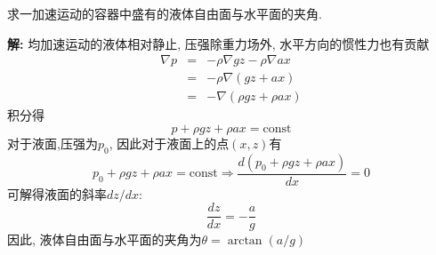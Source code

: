 \begin{problem}[问题4.1]
求一加速运动的容器中盛有的液体自由面与水平面的夹角.
\begin{center}

\end{center}
\end{problem}

\begin{solution}
\textbf{解:} 均加速运动的液体相对静止, 压强除重力场外, 水平方向的惯性力也有贡献
\begin{eqnarray}
\nabla p & = & -\rho\nabla gz-\rho\nabla ax\nonumber\\
         & = & -\rho\nabla(gz+ax)\nonumber\\
         & = & -\nabla(\rho gz+\rho ax)\nonumber
\end{eqnarray}
积分得
\[
p + \rho gz+\rho ax = \mathrm{const}
\]
对于液面,压强为$p_0$, 因此对于液面上的点$(x,z)$有
\[
p_0 + \rho gz+\rho ax = \mathrm{const}\Rightarrow \frac{d(p_0 + \rho gz+\rho ax)}{dx} = 0
\]
可解得液面的斜率$dz/dx$:
\[
\frac{dz}{dx}= -\frac{a}{g}
\]
因此, 液体自由面与水平面的夹角为$\theta = \arctan (a/g)$
\end{solution} 
